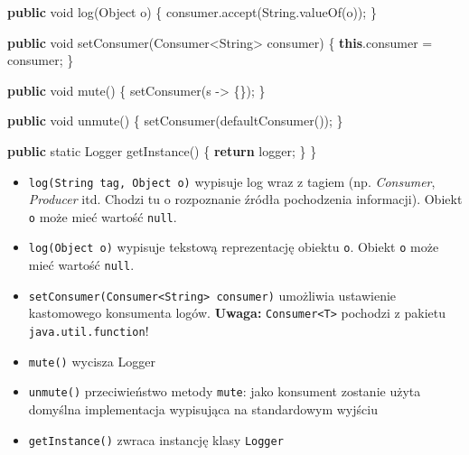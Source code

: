 \documentclass[11pt]{article}
\providecommand{\tightlist}{%
      \setlength{\itemsep}{0pt}\setlength{\parskip}{0pt}}
\newenvironment{Shaded}{}{}
\newcommand{\KeywordTok}[1]{\textcolor[rgb]{0.00,0.44,0.13}{\textbf{{#1}}}}
\newcommand{\DataTypeTok}[1]{\textcolor[rgb]{0.56,0.13,0.00}{{#1}}}
\newcommand{\FunctionTok}[1]{\textcolor[rgb]{0.02,0.16,0.49}{{#1}}}
\newcommand{\NormalTok}[1]{{#1}}
\newcommand{\ControlFlowTok}[1]{\textcolor[rgb]{0.00,0.44,0.13}{\textbf{{#1}}}}
\newcommand{\OperatorTok}[1]{\textcolor[rgb]{0.40,0.40,0.40}{{#1}}}
\newcommand{\BuiltInTok}[1]{{#1}}
\begin{document}
\begin{Shaded}
\begin{Highlighting}[]
    \KeywordTok{public} \DataTypeTok{void} \FunctionTok{log}\OperatorTok{(}\BuiltInTok{Object}\NormalTok{ o}\OperatorTok{)} \OperatorTok{\{}
\NormalTok{        consumer}\OperatorTok{.}\FunctionTok{accept}\OperatorTok{(}\BuiltInTok{String}\OperatorTok{.}\FunctionTok{valueOf}\OperatorTok{(}\NormalTok{o}\OperatorTok{));}
    \OperatorTok{\}}

    \KeywordTok{public} \DataTypeTok{void} \FunctionTok{setConsumer}\OperatorTok{(}\NormalTok{Consumer}\OperatorTok{\textless{}}\BuiltInTok{String}\OperatorTok{\textgreater{}}\NormalTok{ consumer}\OperatorTok{)} \OperatorTok{\{}
        \KeywordTok{this}\OperatorTok{.}\FunctionTok{consumer} \OperatorTok{=}\NormalTok{ consumer}\OperatorTok{;}
    \OperatorTok{\}}

    \KeywordTok{public} \DataTypeTok{void} \FunctionTok{mute}\OperatorTok{()} \OperatorTok{\{}
        \FunctionTok{setConsumer}\OperatorTok{(}\NormalTok{s }\OperatorTok{{-}\textgreater{}} \OperatorTok{\{\});}
    \OperatorTok{\}}
    
    \KeywordTok{public} \DataTypeTok{void} \FunctionTok{unmute}\OperatorTok{()} \OperatorTok{\{}
        \FunctionTok{setConsumer}\OperatorTok{(}\FunctionTok{defaultConsumer}\OperatorTok{());}
    \OperatorTok{\}}

    \KeywordTok{public} \DataTypeTok{static} \BuiltInTok{Logger} \FunctionTok{getInstance}\OperatorTok{()} \OperatorTok{\{}
        \ControlFlowTok{return}\NormalTok{ logger}\OperatorTok{;}
    \OperatorTok{\}}
\OperatorTok{\}}
\end{Highlighting}
\end{Shaded}

\begin{itemize}
\tightlist
\item
  \texttt{log(String\ tag,\ Object\ o)} wypisuje log wraz z tagiem (np.
  \emph{Consumer}, \emph{Producer} itd. Chodzi tu o rozpoznanie źródła
  pochodzenia informacji). Obiekt \texttt{o} może mieć wartość
  \texttt{null}.
\item
  \texttt{log(Object\ o)} wypisuje tekstową reprezentację obiektu
  \texttt{o}. Obiekt \texttt{o} może mieć wartość \texttt{null}.
\item
  \texttt{setConsumer(Consumer\textless{}String\textgreater{}\ consumer)}
  umożliwia ustawienie kastomowego konsumenta logów. \textbf{Uwaga:}
  \texttt{Consumer\textless{}T\textgreater{}} pochodzi z pakietu
  \texttt{java.util.function}!
\item
  \texttt{mute()} wycisza Logger
\item
  \texttt{unmute()} przeciwieństwo metody \texttt{mute}: jako konsument
  zostanie użyta domyślna implementacja wypisująca na standardowym
  wyjściu
\item
  \texttt{getInstance()} zwraca instancję klasy \texttt{Logger}
\end{itemize}
\end{document}
